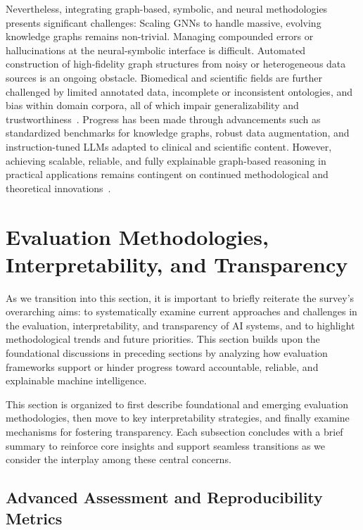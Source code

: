 \documentclass[sigconf]{acmart}
\begin{document}
Nevertheless, integrating graph-based, symbolic, and neural methodologies presents significant challenges:
Scaling GNNs to handle massive, evolving knowledge graphs remains non-trivial.
Managing compounded errors or hallucinations at the neural-symbolic interface is difficult.
Automated construction of high-fidelity graph structures from noisy or heterogeneous data sources is an ongoing obstacle.
Biomedical and scientific fields are further challenged by limited annotated data, incomplete or inconsistent ontologies, and bias within domain corpora, all of which impair generalizability and trustworthiness~\cite{ref36,ref43,ref45,ref53,ref55,ref87,ref94}.
Progress has been made through advancements such as standardized benchmarks for knowledge graphs, robust data augmentation, and instruction-tuned LLMs adapted to clinical and scientific content. However, achieving scalable, reliable, and fully explainable graph-based reasoning in practical applications remains contingent on continued methodological and theoretical innovations~\cite{ref2,ref3,ref18,ref19,ref36,ref47,ref48,ref49,ref50,ref55,ref61,ref62,ref80,ref87,ref88,ref89,ref94,ref95}.

\section{Evaluation Methodologies, Interpretability, and Transparency}

As we transition into this section, it is important to briefly reiterate the survey's overarching aims: to systematically examine current approaches and challenges in the evaluation, interpretability, and transparency of AI systems, and to highlight methodological trends and future priorities. This section builds upon the foundational discussions in preceding sections by analyzing how evaluation frameworks support or hinder progress toward accountable, reliable, and explainable machine intelligence.

This section is organized to first describe foundational and emerging evaluation methodologies, then move to key interpretability strategies, and finally examine mechanisms for fostering transparency. Each subsection concludes with a brief summary to reinforce core insights and support seamless transitions as we consider the interplay among these central concerns.


\subsection{Advanced Assessment and Reproducibility Metrics}
\end{document}
